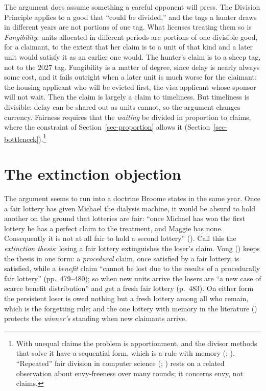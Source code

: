 \documentclass[
  11pt,
  letterpaper,
  DIV=11,
  numbers=noendperiod,
  twoside]{scrartcl}
\newcounter{none} %
\begin{document}
The argument does assume something a careful opponent will press. The
Division Principle applies to a good that ``could be divided,'' and the
tags a hunter draws in different years are not portions of one tag. What
licenses treating them so is \emph{Fungibility}: units allocated in
different periods are portions of one divisible good, for a claimant, to
the extent that her claim is to a unit of that kind and a later unit
would satisfy it as an earlier one would. The hunter's claim is to a
sheep tag, not to the 2027 tag. Fungibility is a matter of degree, since
delay is nearly always some cost, and it fails outright when a later
unit is much worse for the claimant: the housing applicant who will be
evicted first, the visa applicant whose sponsor will not wait. Then the
claim is largely a claim to timeliness. But timeliness is divisible:
delay can be shared out as units cannot, so the argument changes
currency. Fairness requires that the \emph{waiting} be divided in
proportion to claims, where the constraint of
Section~\ref{sec-proportion} allows it
(Section~\ref{sec-bottleneck}).\footnote{With unequal claims the problem
  is apportionment, and the divisor methods that solve it have a
  sequential form, which is a rule with memory
  (;
  ).
  ``Repeated'' fair division in computer science
  (;
  ) rests
  on a related observation about envy-freeness over many rounds; it
  concerns envy, not claims.}

\section{The extinction objection}\label{sec-extinction}

The argument seems to run into a doctrine Broome states in the same
year. Once a fair lottery has given Michael the dialysis machine, it
would be absurd to hold another on the ground that lotteries are fair:
``once Michael has won the first lottery he has a perfect claim to the
treatment, and Maggie has none. Consequently it is not at all fair to
hold a second lottery'' (). Call this the \emph{extinction thesis}: losing a fair lottery
extinguishes the loser's claim. Vong ()
keeps the thesis in one form: a \emph{procedural} claim, once satisfied
by a fair lottery, is satisfied, while a \emph{benefit} claim ``cannot
be lost due to the results of a procedurally fair lottery''
(pp.~479--480); so when new units arrive the losers are ``a new case of
scarce benefit distribution'' and get a fresh fair lottery (p.~483). On
either form the persistent loser is owed nothing but a fresh lottery
among all who remain, which is the forgetting rule; and the one lottery
with memory in the literature
()
protects the \emph{winner's} standing when new claimants arrive.
\end{document}
